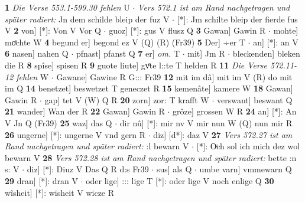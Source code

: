 \documentclass[8pt,a4paper,notitlepage]{article}
\begin{document}
\begin{table}[ht]
\begin{minipage}[t]{0.5\linewidth}
\textbf{1} \textit{Die Verse 553.1-599.30 fehlen} U   $\cdot$ \textit{Vers 572.1 ist am Rand nachgetragen und später radiert:} Jn dem schilde bleip der fuz V   $\cdot$ [*]: Jm schilte bleip der fierde fus V \textbf{2} von] [*]: Von V Vor Q  $\cdot$ guoz] [*]: gus V flusz Q \textbf{3} Gawan] Gawin R  $\cdot$ mohte] moͤchte W \textbf{4} begund er] begond ez V (Q) (R) (Fr39) \textbf{5} Der] ÷er T  $\cdot$ an] [*]: an V \textbf{6} nasen] nahen Q  $\cdot$ pfnast] pfanst Q \textbf{7} er] \textit{om.} T  $\cdot$ mit] Jm R  $\cdot$ bleckenden] bleken die R \textbf{8} spîse] spisen R \textbf{9} guote liute] gvͦte l::te T helden R \textbf{11} \textit{Die Verse 572.11-12 fehlen} W   $\cdot$ Gawane] Gawine R G::: Fr39 \textbf{12} mit im dâ] mit im V (R) do mit im Q \textbf{14} benetzet] beswetzet T geneczet R \textbf{15} kemenâte] kamere W \textbf{18} Gawan] Gawin R  $\cdot$ gap] tet V (W) Q R \textbf{20} zorn] zor: T krafft W  $\cdot$ verswant] beswant Q \textbf{21} wander] Wan der R \textbf{22} Gawan] Gawin R  $\cdot$ grôze] grossen W R \textbf{24} an] [*]: An V Jn Q (Fr39) \textbf{25} waz] das Q  $\cdot$ dir nû] [*]: mir nv V mir nun W (Q) nun mir R \textbf{26} ungerne] [*]: ungerne V vnd gern R  $\cdot$ diz] [d*]: daz V \textbf{27} \textit{Vers 572.27 ist am Rand nachgetragen und später radiert:} :l bewarn V   $\cdot$ [*]: Oͮch sol ich mich dez wol bewarn V \textbf{28} \textit{Vers 572.28 ist am Rand nachgetragen und später radiert:} bette :n s: V   $\cdot$ diz] [*]: Diuz V Das Q R d:s Fr39  $\cdot$ sus] als Q  $\cdot$ umbe varn] vmmewarn Q \textbf{29} dran] [*]: dran V  $\cdot$ oder lige] ::: lige T [*]: oder lige V noch enlige Q \textbf{30} wîsheit] [*]: wisheit V wicze R \newline
\end{minipage}
\end{table}
\end{document}
